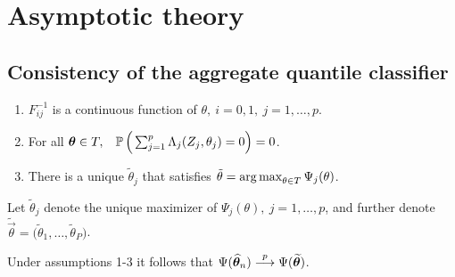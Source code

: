 
\section{Asymptotic theory}
\label{sec:asymptotic-theory}

\subsection{Consistency of the aggregate quantile classifier}
\label{sec:aggregate-classifier-consistency}

\begin{enumerate}[label=\emph{Assumption \arabic*.}, align=left]
\item $F_{ij}^{-1}$ is a continuous function of
  $\theta,~ i=0,1,~ j=1, \dots, p$.
\item For all
  $\bm{\theta} \in T, \hspace{3mm} \mathbb{P}\,\Big(
  \sum_{j=1}^p \Lambda_j (Z_j, \theta_j) = 0
  \Big) = 0$.
\item There is a unique $\tilde{\theta}_j$ that satisfies
  $\tilde{\theta} = \operatorname*{arg\,max}_{\theta \in T} \Psi_j(\theta)$.
\end{enumerate}
Let $\widetilde{\theta}_j$ denote the unique maximizer of
$\Psi_j(\theta),~ j=1, \dots, p$, and further denote
$\widetilde{\vec{\theta}} = \Big( \widetilde{\theta}_1, \dots,
\widetilde{\theta}_P \Big)$.
\vspace{5mm}

\begin{theorem}
  Under assumptions 1-3 it follows that
  $\Psi(\widehat{\bm{\theta}}_n) \stackrel{p}{\longrightarrow} \Psi(\widetilde{\bm{\theta}})$.
\end{theorem}

